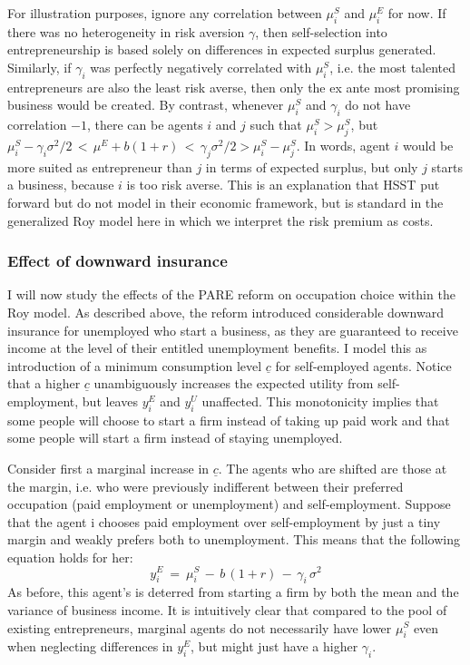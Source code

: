 For illustration purposes, ignore any correlation between $\mu_i^S$ and $\mu_i^E$ for now. If there was no heterogeneity in risk aversion $\gamma$, then self-selection into entrepreneurship is based solely on differences in expected surplus generated. Similarly, if $\gamma_i$ was perfectly negatively correlated with $\mu_i^S$, i.e. the most talented entrepreneurs are also the least risk averse, then only the ex ante most promising business would be created. By contrast, whenever $\mu_i^S$ and $\gamma_i$ do not have correlation $-1$, there can be agents $i$ and $j$ such that $\mu_i^S > \mu_j^S$, but $\mu_i^S - \gamma_i \sigma^2 /2 \, < \, \mu^E + b (1+r) \, < \,  \gamma_j \sigma^2 /2  > \mu_i^S - \mu_j^S$. In words, agent $i$ would be more suited as entrepreneur than $j$ in terms of expected surplus, but only $j$ starts a business, because $i$ is too risk averse. This is an explanation that HSST put forward but do not model in their economic framework, but is standard in the generalized Roy model here in which we interpret the risk premium as costs. \newline


\subsubsection*{Effect of downward insurance}

I will now study the effects of the PARE reform on occupation choice within the Roy model. As described above, the reform introduced considerable downward insurance for unemployed who start a business, as they are guaranteed to receive income at the level of their entitled unemployment benefits. I model this as introduction of a minimum consumption level $\underline{c}$ for self-employed agents.
Notice that a higher $\underline{c}$ unambiguously increases the expected utility from self-employment, but leaves $y_i^E$ and $y_i^U$ unaffected. This monotonicity implies that some people will choose to start a firm instead of taking up paid work and that some people will start a firm instead of staying unemployed. \newline

\noindent Consider first a marginal increase in $\underline{c}$. The agents who are shifted are those at the margin, i.e. who were previously indifferent between their preferred occupation (paid employment or unemployment) and self-employment. Suppose that the agent i chooses paid employment over self-employment by just a tiny margin and weakly prefers both to unemployment. This means that the following equation holds for her:
\begin{equation}
y^E_i \:  = \:  \mu^S_i \, - \,  b \, (1+r) \, - \, \gamma_i \, \sigma^2
\end{equation} 
As before, this agent's is deterred from starting a firm by both the mean and the variance of business income. It is intuitively clear that compared to the pool of existing entrepreneurs, marginal agents do not necessarily have lower $\mu^S_i$ even when neglecting differences in $y^E_i$, but might just have a higher $\gamma_i$. \newline

